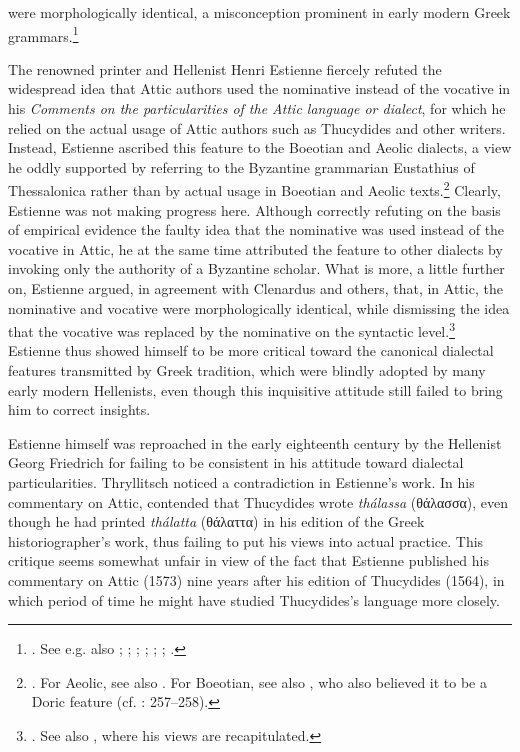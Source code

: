 were morphologically identical, a misconception prominent in early modern Greek grammars.\footnote{\citet[7, misprint for 6]{Clenardus1530}. See e.g. also \citet[534]{Crusius1558}; \citet[12\textsc{\textsuperscript{r}}]{Baile1588}; \citet[11, 37]{Walper1589}; \citet[32, 34]{Gretser1593}; \citet[53, 453]{Lancelot1655}; \citet[101]{Giraudeau1739}; \citet[20]{Facius1782}.}

The renowned printer and Hellenist Henri Estienne fiercely refuted the widespread idea that Attic authors used the nominative instead of the vocative in his \textit{Comments on the particularities of the Attic language or dialect}, for which he relied on the actual usage of Attic authors such as Thucydides and other writers. Instead, Estienne ascribed this feature to the Boeotian and Aeolic dialects, a view he oddly supported by referring to the Byzantine grammarian Eustathius of Thessalonica rather than by actual usage in Boeotian and Aeolic texts.\footnote{\citet[15]{Estienne1573}. For Aeolic, see also \citet[(.4\textsc{\textsuperscript{v}}]{Schmidt1604}. For Boeotian, see also \citet[71]{Merigon1621}, who also believed it to be a Doric feature (cf. \citealt{Maittaire1706}: 257–258).} Clearly, Estienne was not making progress here. Although correctly refuting on the basis of empirical evidence the faulty idea that the nominative was used instead of the vocative in Attic, he at the same time attributed the feature to other dialects by invoking only the authority of a Byzantine scholar. What is more, a little further on, Estienne argued, in agreement with Clenardus and others, that, in Attic, the nominative and vocative were morphologically identical, while dismissing the idea that the vocative was replaced by the nominative on the syntactic level.\footnote{\citet[17]{Estienne1573}. See also \citet[29, 42–43, 150]{Estienne1573}, where his views are recapitulated.} Estienne thus showed himself to be more critical toward the canonical dialectal features transmitted by Greek tradition, which were blindly adopted by many early modern Hellenists, even though this inquisitive attitude still failed to bring him to correct insights.

Estienne himself was reproached in the early eighteenth century by the Hellenist Georg Friedrich \citet[d.3\textsuperscript{v}]{Thryllitsch1709} for failing to be consistent in his attitude toward dialectal particularities. Thryllitsch noticed a contradiction in Estienne’s work. In his commentary on Attic, \citet[13]{Estienne1573} contended that Thucydides wrote \textit{thálassa} (θάλασσα), even though he had printed \textit{thálatta} (θάλαττα) in his edition of the Greek historiographer’s work, thus failing to put his views into actual practice. This critique seems somewhat unfair in view of the fact that Estienne published his commentary on Attic (1573) nine years after his edition of Thucydides (1564), in which period of time he might have studied Thucydides’s language more closely.

